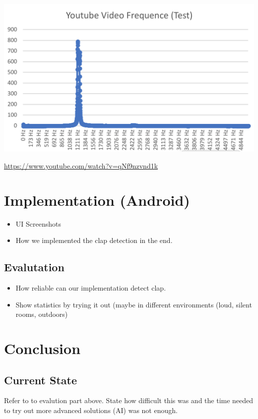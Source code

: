 \documentclass
[
 12pt, %
       DIV12,
       a4paper,
       oneside,
       titlepage,
       parskip=half,
       headings=normal,
       listof=totoc,
       bibliography=totoc,
       index=totoc,
       captions=tableheading,
       ]{scrreprt}
\begin{document}
\begin{center}
\includegraphics[width=.9\linewidth]{./imgs/yttestandroid.png}
\end{center}

\url{https://www.youtube.com/watch?v=qNf9nzvnd1k}

\chapter{Implementation (Android)}
\label{sec:org1401e45}
\begin{itemize}
\item UI Screenshots
\item How we implemented the clap detection in the end.
\end{itemize}

\section{Evalutation}
\label{sec:orge1bedac}
\begin{itemize}
\item How reliable can our implementation detect clap.
\item Show statistics by trying it out (maybe in different environments (loud,
silent rooms, outdoors)
\end{itemize}

\chapter{Conclusion}
\label{sec:org77e7451}
\section{Current State}
\label{sec:orgc960a3e}
Refer to to evalution part above. State how difficult this was and the time
needed to try out more advanced solutions (AI) was not enough.
\end{document}
